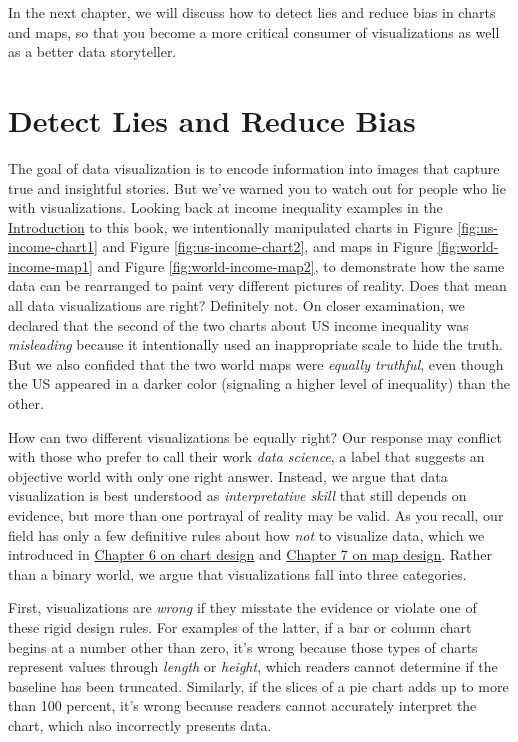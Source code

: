 \documentclass[
  english,
]{book}
\begin{document}
In the next chapter, we will discuss how to detect lies and reduce bias in charts and maps, so that you become a more critical consumer of visualizations as well as a better data storyteller.

\hypertarget{detect}{%
\chapter{Detect Lies and Reduce Bias}\label{detect}}

The goal of data visualization is to encode information into images that capture true and insightful stories. But we've warned you to watch out for people who lie with visualizations. Looking back at income inequality examples in the \href{introduction.html}{Introduction} to this book, we intentionally manipulated charts in Figure \ref{fig:us-income-chart1} and Figure \ref{fig:us-income-chart2}, and maps in Figure \ref{fig:world-income-map1} and Figure \ref{fig:world-income-map2}, to demonstrate how the same data can be rearranged to paint very different pictures of reality. Does that mean all data visualizations are right? Definitely not. On closer examination, we declared that the second of the two charts about US income inequality was \emph{misleading} because it intentionally used an inappropriate scale to hide the truth. But we also confided that the two world maps were \emph{equally truthful}, even though the US appeared in a darker color (signaling a higher level of inequality) than the other.

How can two different visualizations be equally right? Our response may conflict with those who prefer to call their work \emph{data science}, a label that suggests an objective world with only one right answer. Instead, we argue that data visualization is best understood as \emph{interpretative skill} that still depends on evidence, but more than one portrayal of reality may be valid. As you recall, our field has only a few definitive rules about how \emph{not} to visualize data, which we introduced in \href{chart-design.html}{Chapter 6 on chart design} and \href{map-design.html}{Chapter 7 on map design}. Rather than a binary world, we argue that visualizations fall into three categories.

First, visualizations are \emph{wrong} if they misstate the evidence or violate one of these rigid design rules. For examples of the latter, if a bar or column chart begins at a number other than zero, it's wrong because those types of charts represent values through \emph{length} or \emph{height}, which readers cannot determine if the baseline has been truncated. Similarly, if the slices of a pie chart adds up to more than 100 percent, it's wrong because readers cannot accurately interpret the chart, which also incorrectly presents data.
\end{document}
